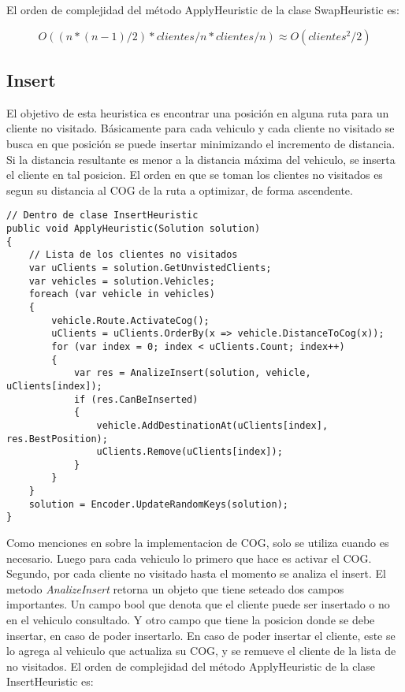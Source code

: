 \bigskip

El orden de complejidad del método ApplyHeuristic de la clase SwapHeuristic es:

\begin{equation*}
O((n * (n-1) / 2 ) * clientes/n * clientes/n) \approx O(clientes^2/2)
\end{equation*}

\subsection{Insert}

El objetivo de esta heuristica es encontrar una posición en alguna ruta para un cliente no visitado. Básicamente para cada vehiculo y cada cliente no visitado se busca en que posición se puede insertar minimizando el incremento de distancia. Si la distancia resultante es menor a la distancia máxima del vehiculo, se inserta el cliente en tal posicion. El orden en que se toman los clientes no visitados es segun su distancia al COG de la ruta a optimizar, de forma ascendente.

\begin{minipage}{\textwidth}
\begin{lstlisting}
// Dentro de clase InsertHeuristic
public void ApplyHeuristic(Solution solution)
{
	// Lista de los clientes no visitados
	var uClients = solution.GetUnvistedClients;	
	var vehicles = solution.Vehicles;
	foreach (var vehicle in vehicles)
	{
		vehicle.Route.ActivateCog();
		uClients = uClients.OrderBy(x => vehicle.DistanceToCog(x));	
		for (var index = 0; index < uClients.Count; index++)
		{
			var res = AnalizeInsert(solution, vehicle, uClients[index]);
			if (res.CanBeInserted)
			{
				vehicle.AddDestinationAt(uClients[index], res.BestPosition);
				uClients.Remove(uClients[index]);
			}
		}
	}
	solution = Encoder.UpdateRandomKeys(solution);
}
\end{lstlisting}
\end{minipage}

\bigskip

Como menciones en sobre la implementacion de COG, solo se utiliza cuando es necesario. Luego para cada vehiculo lo primero que hace es activar el COG. Segundo, por cada cliente no visitado hasta el momento se analiza el insert. El metodo \textit{AnalizeInsert} retorna un objeto que tiene seteado dos campos importantes. Un campo bool que denota que el cliente puede ser insertado o no en el vehiculo consultado. Y otro campo que tiene la posicion donde se debe insertar, en caso de poder insertarlo. En caso de poder insertar el cliente, este se lo agrega al vehiculo que actualiza su COG, y se remueve el cliente de la lista de no visitados. El orden de complejidad del método ApplyHeuristic de la clase InsertHeuristic es: 

